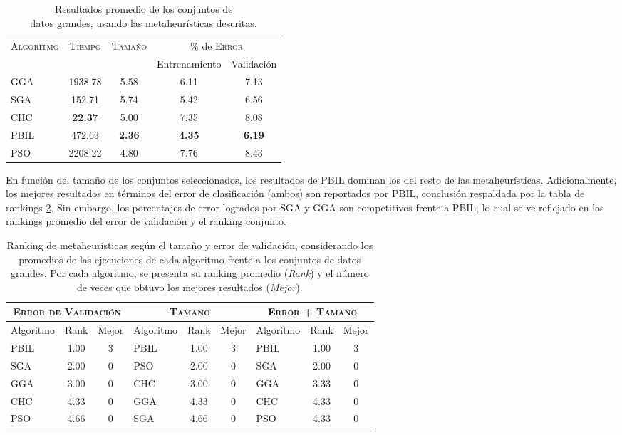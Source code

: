 \begin{table}[h!]
\centering
\begin{tabular}{l c c c c}
\hline
\multirow{2}{*}{\textsc{Algoritmo}}
	& \multirow{2}{*}{\textsc{Tiempo}}
	& \multirow{2}{*}{\textsc{Tamaño}}
	& \multicolumn{2}{c}{$\%$ de \textsc{Error}} \\\cline{4-5}
 & & & \scriptsize{Entrenamiento} & \scriptsize{Validación} \\
\hline
\hline
GGA  & 1938.78 & 5.58 & 6.11 & 7.13 \\
SGA  &  152.71 & 5.74 & 5.42 & 6.56 \\
CHC  & \textbf{22.37} & 5.00 & 7.35 & 8.08 \\
PBIL &  472.63 & \textbf{2.36} & \textbf{4.35} & \textbf{6.19} \\
PSO  & 2208.22 & 4.80 & 7.76 & 8.43 \\
\hline
\end{tabular}
\caption[Resultados de metaheurísticas usando conjuntos de datos grandes]{Resultados promedio de los conjuntos de\\datos grandes, usando las metaheurísticas descritas.}
\label{res-big}
\end{table}

En función del tamaño de los conjuntos seleccionados, los resultados de PBIL dominan los del resto de las metaheurísticas. Adicionalmente, los mejores resultados en términos del error de clasificación (ambos) son reportados por PBIL, conclusión respaldada por la tabla de rankings \ref{res-big-rank}. Sin embargo, los porcentajes de error logrados por SGA y GGA son competitivos frente a PBIL, lo cual se ve reflejado en los rankings promedio del error de validación y el ranking conjunto.

\begin{table}[h!]
\centering
\begin{tabular}{l c c|l c c|l c c}
\hline
\multicolumn{3}{c|}{\textsc{Error de Validación}}
	& \multicolumn{3}{c|}{\textsc{Tamaño}}
	& \multicolumn{3}{c}{\textsc{Error + Tamaño}} \\
\hline
Algoritmo & Rank & Mejor & Algoritmo & Rank & Mejor & Algoritmo & Rank & Mejor \\
\hline
\hline
PBIL & 1.00 & 3 & PBIL & 1.00 & 3 & PBIL & 1.00 & 3 \\
SGA  & 2.00 & 0 & PSO  & 2.00 & 0 & SGA  & 2.00 & 0 \\
GGA  & 3.00 & 0 & CHC  & 3.00 & 0 & GGA  & 3.33 & 0 \\
CHC  & 4.33 & 0 & GGA  & 4.33 & 0 & CHC  & 4.33 & 0 \\
PSO  & 4.66 & 0 & SGA  & 4.66 & 0 & PSO  & 4.33 & 0 \\
\hline
\end{tabular}
\caption[Ranking de metaheurísticas según el tamaño y error de validación en conjuntos de datos grandes]{Ranking de metaheurísticas según el tamaño y error de validación, considerando los promedios de las ejecuciones de cada algoritmo frente a los conjuntos de datos grandes. Por cada algoritmo, se presenta su ranking promedio (\emph{Rank}) y el número de veces que obtuvo los mejores resultados (\emph{Mejor}).}
\label{res-big-rank}
\end{table}

